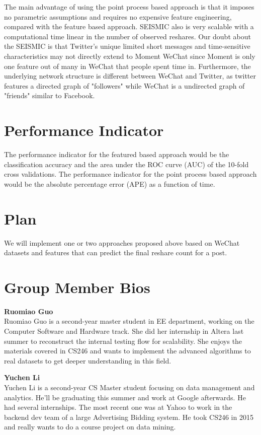 \documentclass[10pt]{article}
\theoremstyle{plain}
\begin{document}
The main advantage of using the point process based approach is that it imposes no parametric assumptions and requires no expensive feature engineering, compared with the feature based approach. SEISMIC also is very scalable with a computational time linear in the number of observed reshares. Our doubt about the SEISMIC is that Twitter's unique limited short messages and time-sensitive characteristics may not directly extend to Moment WeChat since Moment is only one feature out of many in WeChat that people spent time in. Furthermore, the underlying network structure is different between WeChat and Twitter, as twitter features a directed graph of "followers" while WeChat is a undirected graph of "friends" similar to Facebook.

\section{Performance Indicator}
The performance indicator for the featured based approach would be the classification accuracy and the area under the ROC curve (AUC) of the 10-fold cross validations. The performance indicator for the point process based approach would be the absolute percentage error (APE) as a function of time. 
\section{Plan}
We will implement one or two approaches proposed above based on WeChat datasets and features that can predict the final reshare count for a post.
\section{Group Member Bios}
\textbf{Ruomiao Guo}\\
Ruomiao Guo is a second-year master student in EE department, working on the Computer Software and Hardware track. She did her internship in Altera last summer to reconstruct the internal testing flow for scalability. She enjoys the materials covered in CS246 and wants to implement the advanced algorithms to real datasets to get deeper understanding in this field.\par

\textbf{Yuchen Li}\\
Yuchen Li is a second-year CS Master student focusing on data management and analytics. He'll be graduating this summer and work at Google afterwards. He had several internships. The most recent one was at Yahoo to work in the backend dev team of a large Advertising Bidding system. He took CS246 in 2015 and really wants to do a course project on data mining.\\
\end{document}
